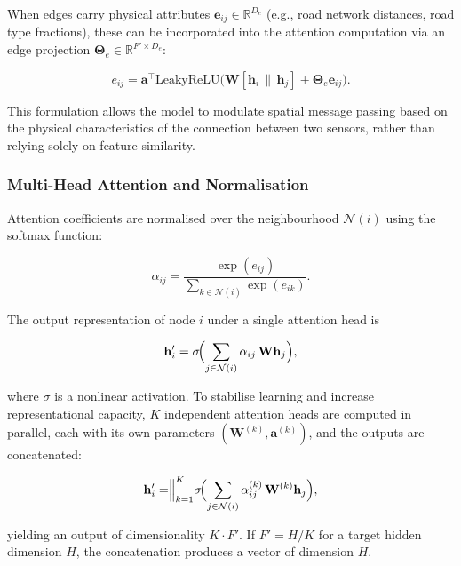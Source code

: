 When edges carry physical attributes $\mathbf{e}_{ij} \in \mathbb{R}^{D_e}$ (e.g., road network distances, road type fractions), these can be incorporated into the attention computation via an edge projection $\boldsymbol{\Theta}_e \in \mathbb{R}^{F' \times D_e}$:

\begin{equation}
    e_{ij} = \mathbf{a}^{\top} \text{LeakyReLU}\!\bigl(\mathbf{W} [\mathbf{h}_i \,\|\, \mathbf{h}_j] + \boldsymbol{\Theta}_e \mathbf{e}_{ij}\bigr).
    \label{eq:gatv2-edge}
\end{equation}

\noindent This formulation allows the model to modulate spatial message passing based on the physical characteristics of the connection between two sensors, rather than relying solely on feature similarity.

\subsubsection{Multi-Head Attention and Normalisation}

Attention coefficients are normalised over the neighbourhood $\mathcal{N}(i)$ using the softmax function:

\begin{equation}
    \alpha_{ij} = \frac{\exp(e_{ij})}{\sum_{k \in \mathcal{N}(i)} \exp(e_{ik})}.
    \label{eq:gat-softmax}
\end{equation}

\noindent The output representation of node $i$ under a single attention head is

\begin{equation}
    \mathbf{h}'_i = \sigma\!\Bigl(\sum_{j \in \mathcal{N}(i)} \alpha_{ij} \, \mathbf{W} \mathbf{h}_j\Bigr),
    \label{eq:gat-aggregate}
\end{equation}

\noindent where $\sigma$ is a nonlinear activation. To stabilise learning and increase representational capacity, $K$ independent attention heads are computed in parallel, each with its own parameters $(\mathbf{W}^{(k)}, \mathbf{a}^{(k)})$, and the outputs are concatenated:

\begin{equation}
    \mathbf{h}'_i = \Bigr\|_{k=1}^{K} \sigma\!\Bigl(\sum_{j \in \mathcal{N}(i)} \alpha_{ij}^{(k)} \, \mathbf{W}^{(k)} \mathbf{h}_j\Bigr),
    \label{eq:gat-multihead}
\end{equation}

\noindent yielding an output of dimensionality $K \cdot F'$. If $F' = H / K$ for a target hidden dimension $H$, the concatenation produces a vector of dimension $H$.

